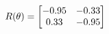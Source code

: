 \documentclass[preview]{standalone}
\begin{document}
\begin{align*}
\special{dvisvgm:raw <g id='unique000'>}R(\theta) = \begin{bmatrix}-0.95 & -0.33\\0.33 & -0.95\end{bmatrix}\special{dvisvgm:raw </g>}
\end{align*}
\end{document}
